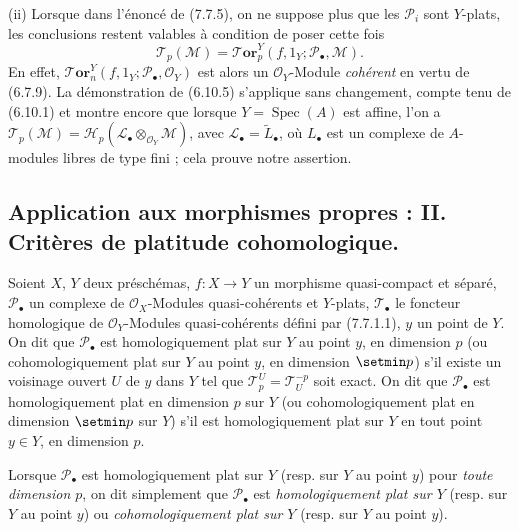 \begin{remarks}[7.7.12]
\medskip
\textnormal{(ii)} Lorsque dans l'énoncé de (7.7.5), on ne suppose plus que les
$\mathscr P_i$ sont $Y$-plats, les conclusions restent valables à condition de
poser cette fois
\[
  \mathscr T_p(\mathscr M)
  =
  \boldsymbol{\mathscr{T}\!or}^Y_p
    (f,1_Y;\mathscr P_\bullet,\mathscr M).
  \tag{7.7.12.1}\label{III.7.7.12.1.fr}
\]
En effet, $\boldsymbol{\mathscr{T}\!or}^Y_n(f,1_Y;\mathscr P_\bullet,\mathscr O_Y)$ est
alors un $\mathscr O_Y$-Module \emph{cohérent} en vertu de (6.7.9). La
démonstration de (6.10.5) s'applique sans changement, compte tenu de (6.10.1)
et montre encore que lorsque $Y=\operatorname{Spec}(A)$ est affine, l'on a
$\mathscr T_p(\mathscr M)=\mathscr H_p(\mathscr L_\bullet\otimes_{\mathscr O_Y}\mathscr M)$,
avec $\mathscr L_\bullet=\widetilde{L}_\bullet$,
où $L_\bullet$ est un complexe de $A$-modules libres de type fini ; cela prouve
notre assertion.
\end{remarks}

\subsection{Application aux morphismes propres : II. Critères de platitude
cohomologique.}
\label{subsection:III.7.8.fr}

\begin{definition}[7.8.1]
Soient $X$, $Y$ deux préschémas, $f:X\to Y$ un morphisme quasi-compact et
séparé, $\mathscr P_\bullet$ un complexe de $\mathscr O_X$-Modules
quasi-cohérents et $Y$-plats, $\mathscr T_\bullet$ le foncteur homologique de
$\mathscr O_Y$-Modules quasi-cohérents défini par \textup{(7.7.1.1)}, $y$ un point de $Y$.
On dit que $\mathscr P_\bullet$ est
homologiquement plat sur $Y$ au point $y$, en dimension $p$ \textup{(ou}
cohomologiquement plat sur $Y$ au point $y$, en dimension $\setmin p$) s'il
existe un voisinage ouvert $U$ de $y$ dans $Y$ tel que
$\mathscr T_p^U=\mathscr T_U^{-p}$ soit exact. On dit que $\mathscr P_\bullet$ est
homologiquement plat en dimension $p$ sur $Y$ \textup{(ou}
cohomologiquement plat en dimension $\setmin p$ sur $Y$) s'il est
homologiquement plat sur $Y$ en tout point $y\in Y$, en dimension $p$.

\upshape Lorsque $\mathscr P_\bullet$ est homologiquement plat sur $Y$ (resp. sur $Y$ au
point $y$) pour \emph{toute dimension $p$}, on dit simplement que
$\mathscr P_\bullet$ est \emph{homologiquement plat sur $Y$} (resp. sur $Y$ au
point $y$) ou \emph{cohomologiquement plat sur $Y$} (resp. sur $Y$ au point
$y$).
\end{definition}

